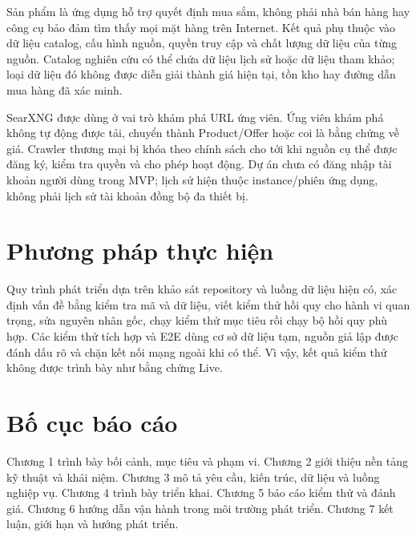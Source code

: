 Sản phẩm là ứng dụng hỗ trợ quyết định mua sắm, không phải nhà bán hàng hay công cụ bảo đảm tìm thấy mọi mặt hàng trên Internet. Kết quả phụ thuộc vào dữ liệu catalog, cấu hình nguồn, quyền truy cập và chất lượng dữ liệu của từng nguồn. Catalog nghiên cứu có thể chứa dữ liệu lịch sử hoặc dữ liệu tham khảo; loại dữ liệu đó không được diễn giải thành giá hiện tại, tồn kho hay đường dẫn mua hàng đã xác minh.

SearXNG được dùng ở vai trò khám phá URL ứng viên. Ứng viên khám phá không tự động được tải, chuyển thành Product/Offer hoặc coi là bằng chứng về giá. Crawler thương mại bị khóa theo chính sách cho tới khi nguồn cụ thể được đăng ký, kiểm tra quyền và cho phép hoạt động. Dự án chưa có đăng nhập tài khoản người dùng trong MVP; lịch sử hiện thuộc instance/phiên ứng dụng, không phải lịch sử tài khoản đồng bộ đa thiết bị.

\section{Phương pháp thực hiện}

Quy trình phát triển dựa trên khảo sát repository và luồng dữ liệu hiện có, xác định vấn đề bằng kiểm tra mã và dữ liệu, viết kiểm thử hồi quy cho hành vi quan trọng, sửa nguyên nhân gốc, chạy kiểm thử mục tiêu rồi chạy bộ hồi quy phù hợp. Các kiểm thử tích hợp và E2E dùng cơ sở dữ liệu tạm, nguồn giả lập được đánh dấu rõ và chặn kết nối mạng ngoài khi có thể. Vì vậy, kết quả kiểm thử không được trình bày như bằng chứng Live.

\section{Bố cục báo cáo}

Chương 1 trình bày bối cảnh, mục tiêu và phạm vi. Chương 2 giới thiệu nền tảng kỹ thuật và khái niệm. Chương 3 mô tả yêu cầu, kiến trúc, dữ liệu và luồng nghiệp vụ. Chương 4 trình bày triển khai. Chương 5 báo cáo kiểm thử và đánh giá. Chương 6 hướng dẫn vận hành trong môi trường phát triển. Chương 7 kết luận, giới hạn và hướng phát triển.
